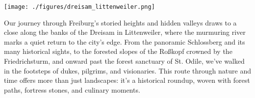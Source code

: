 \documentclass[landscape, a4paper]{article}
\begin{document}
\begin{minipage}[t]{0.31\textwidth}
	\texttt{[image: ./figures/dreisam\_littenweiler.png]}
	\setlength{\parskip}{0.25cm}

  Our journey through Freiburg’s storied heights and hidden valleys draws to a close along the banks of the Dreisam in Littenweiler, where the murmuring river marks a quiet return to the city’s edge. From the panoramic Schlossberg and its many historical sights, to the forested slopes of the Roßkopf crowned by the Friedrichsturm, and onward past the forest sanctuary of St. Odile, we’ve walked in the footsteps of dukes, pilgrims, and visionaries. This route through nature and time offers more than just landscapes: it’s a historical roundup, woven with forest paths, fortress stones, and culinary moments.
\end{minipage}%
\newpage
\end{document}
